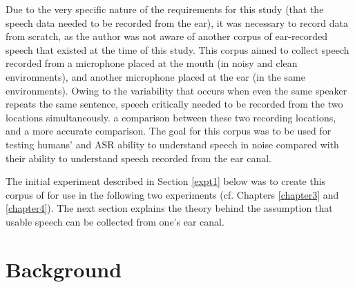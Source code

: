 Due to the very specific nature of the requirements for this study (\DIFaddbegin {}\DIFaddend that the speech data \DIFdelbegin {}\DIFdelend needed to be recorded from the ear), it was necessary to record data from scratch, as the author was not aware of another corpus of ear-recorded speech that existed at the time of this study.  This corpus aimed to collect speech recorded from a microphone placed at the mouth (in noisy and clean environments), and another microphone placed at the ear (in the same environments). Owing to the variability that occurs when even the same speaker repeats the same sentence, speech critically needed to be recorded from the two locations simultaneously.  \DIFdelbegin {}\DIFdelend \DIFaddbegin {}\DIFaddend a comparison between these two recording locations, and \DIFdelbegin {}\DIFdelend \DIFaddbegin {}\DIFaddend a more accurate comparison.  The goal for this corpus was to be used for testing humans' and ASR ability to understand speech in noise compared with their ability to understand speech recorded from the ear canal.


The \DIFaddbegin {}\DIFaddend initial experiment described in Section \ref{expt1} below was \DIFdelbegin {}\DIFdelend to create this corpus of \DIFdelbegin {}\DIFdelend \DIFaddbegin {}\DIFaddend for use in the following two experiments (cf. Chapters \ref{chapter3} and \ref{chapter4}).  The next section explains the theory behind the assumption that usable speech can be collected from \DIFdelbegin {}\DIFdelend \DIFaddbegin {}\DIFaddend one's ear canal.

\section{Background}



